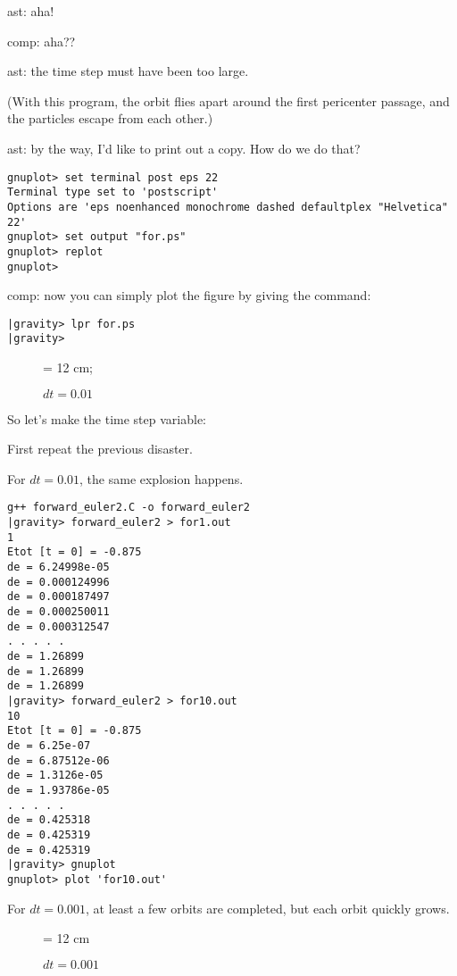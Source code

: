 ast: aha!

comp: aha??

ast: the time step must have been too large.

(With this program, the orbit flies apart around the first pericenter
passage, and the particles escape from each other.)

ast: by the way, I'd like to print out a copy.  How do we do that?

\begin{verbatim}
gnuplot> set terminal post eps 22
Terminal type set to 'postscript'
Options are 'eps noenhanced monochrome dashed defaultplex "Helvetica" 22'
gnuplot> set output "for.ps"
gnuplot> replot
gnuplot> 
\end{verbatim}

comp: now you can simply plot the figure by giving the command:

\begin{verbatim}
|gravity> lpr for.ps
|gravity>
\end{verbatim}

\begin{figure}
\begin{center}
\leavevmode
\epsfxsize = 12 cm;
\caption{$dt = 0.01$}
\label{fig:for}
\end{center}
\end{figure}

So let's make the time step variable:



First repeat the previous disaster.

For $dt = 0.01$, the same explosion happens.

\begin{verbatim}
g++ forward_euler2.C -o forward_euler2
|gravity> forward_euler2 > for1.out
1
Etot [t = 0] = -0.875
de = 6.24998e-05
de = 0.000124996
de = 0.000187497
de = 0.000250011
de = 0.000312547
. . . . .
de = 1.26899
de = 1.26899
de = 1.26899
|gravity> forward_euler2 > for10.out
10
Etot [t = 0] = -0.875
de = 6.25e-07
de = 6.87512e-06
de = 1.3126e-05
de = 1.93786e-05
. . . . .
de = 0.425318
de = 0.425319
de = 0.425319
|gravity> gnuplot
gnuplot> plot 'for10.out'
\end{verbatim}

For $dt = 0.001$, at least a few orbits are completed, but each orbit
quickly grows.

\begin{figure}
\begin{center}
\leavevmode
\epsfxsize = 12 cm
\caption{$dt = 0.001$}
\label{fig:for10}
\end{center}
\end{figure}

